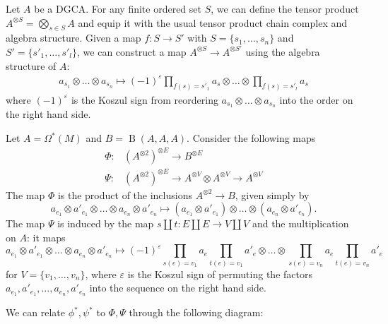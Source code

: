 \documentclass{scrartcl}
\theoremstyle{plain}
\theoremstyle{definition}
\renewcommand{\epsilon}{\varepsilon}
\DeclareMathOperator{\Map}{Map}
\DeclareMathOperator{\BC}{B}
\renewcommand{\coprod}{\mathbin{\amalg}}
\newcommand{\Prod}{\prod}
\begin{document}
Let $A$ be a DGCA. For any finite ordered set $S$, we can define the tensor product $A^{\otimes S} = \bigotimes_{s\in S} A$ and equip it with the usual tensor product chain complex and algebra structure. Given a map $f\colon S\to S'$ with $S = \{s_1,\dots, s_n\}$ and $S' = \{s'_1,\dots, s'_l\}$, we can construct a map $A^{\otimes S}\to A^{\otimes S'}$ using the algebra structure of $A$:
\begin{align*}
    a_{s_1}\otimes\dots\otimes a_{s_n}\mapsto (-1)^\epsilon \Prod_{f(s) =s'_1} a_s \otimes\dots \otimes \Prod_{f(s) =s'_l} a_s
\end{align*}
where $(-1)^\epsilon$ is the Koszul sign from reordering $a_{s_1}\otimes\dots\otimes a_{s_n}$ into the order on the right hand side. 

Let $A=\Omega^*(M)$ and $B = \BC(A, A, A)$. Consider the following maps
\begin{align*}
    \Phi\colon& (A^{\otimes 2})^{\otimes E}\to B^{\otimes E} \\
    \Psi\colon& (A^{\otimes 2})^{\otimes E} \to A^{\otimes V}\otimes A^{\otimes V}\to A^{\otimes V} 
\end{align*}
The map $\Phi$ is the product of the inclusions $A^{\otimes 2}\to B$, given simply by
$$a_{e_1}\otimes a'_{e_1}\otimes\dots\otimes a_{e_n}\otimes a'_{e_n} \mapsto (a_{e_1}\otimes a'_{e_1}) \otimes \dots\otimes (a_{e_n}\otimes a'_{e_n}).$$ 
The map $\Psi$ is induced by the map $s\coprod t\colon E\coprod E\to V\coprod V$ and the multiplication on $A$: it maps 
$$a_{e_1}\otimes a'_{e_1}\otimes\dots\otimes a_{e_n}\otimes a'_{e_n} \mapsto (-1)^\epsilon \Prod_{s(e) = v_1}a_e \Prod_{t(e) = v_1} a'_e \otimes \dots\otimes \Prod_{s(e) = v_n}a_e \Prod_{t(e) = v_n} a'_e$$
for $V = \{v_1,\dots, v_n\}$, where $\epsilon$ is the Koszul sign of permuting the factors $a_{e_1}, a'_{e_1}, \dots, a_{e_n}, a'_{e_n}$ into the sequence on the right hand side. 

We can relate $\phi^*, \psi^*$ to $\Phi, \Psi$ through the following diagram: 
\begin{center}
\end{center}
\end{document}
